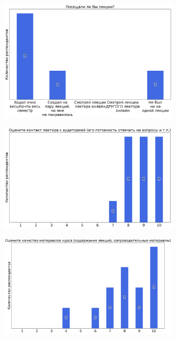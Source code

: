 		\begin{figure}[H]
			\centering
            \begin{subfigure}[b]{0.45\textwidth}
				\centering
				\includegraphics[width=\textwidth]{images/4 course/Теория информации/lecturer-questions-Григорьев А.А.-0.png}
			\end{subfigure}
			\begin{subfigure}[b]{0.45\textwidth}
				\centering
				\includegraphics[width=\textwidth]{images/4 course/Теория информации/lecturer-marks-Григорьев А.А.-0.png}
			\end{subfigure}
			\begin{subfigure}[b]{0.45\textwidth}
				\centering
				\includegraphics[width=\textwidth]{images/4 course/Теория информации/lecturer-marks-Григорьев А.А.-1.png}

\end{subfigure}
\end{figure}
